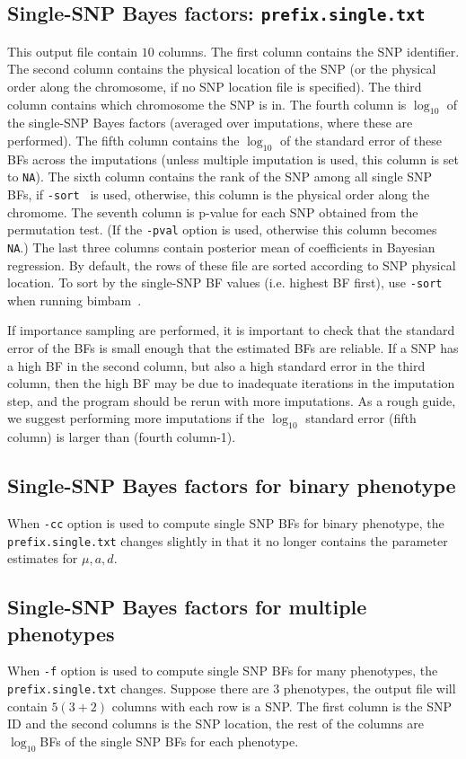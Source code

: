 \documentclass[11pt,Palatino]{article}
\def\bimbam{{\sc bimbam}~}
\begin{document}
\subsection{Single-SNP Bayes factors: {\tt prefix.single.txt}}

This output file contain $10$ columns. The first column contains the SNP identifier. The second column contains the physical location of the SNP
(or the physical order along the chromosome, if no SNP location file is specified). The third column contains which chromosome the SNP is in. The fourth column is $\log_{10}$ of the single-SNP Bayes factors (averaged over imputations, where these are performed).
The fifth column contains the $\log_{10}$ of the standard error of these BFs
across the imputations (unless multiple imputation is used, this column is set to {\tt NA}). The sixth column contains the rank of the SNP
among all single SNP BFs, if {\tt -sort } is used, otherwise, this column is the physical order along the chromome.   The seventh column is p-value for each SNP obtained from the permutation test. (If the {\tt -pval} option is used, otherwise this column becomes {\tt NA}.)
The last three columns contain posterior mean of coefficients in Bayesian regression.
By default, the rows of these file are sorted according to SNP physical location. To sort by the single-SNP BF values (i.e. highest BF first), use {\tt -sort} when running \bimbam.

If importance sampling are performed, it is important to check that the standard error
of the BFs is small enough that the estimated BFs are reliable.
If a SNP has a high BF in the second column, but also a high standard error in the third column,
then the high BF may be due to inadequate iterations in the imputation step, and the program should be rerun with more imputations.
As a rough guide, we suggest performing more imputations
if the $\log_{10}$ standard error (fifth column) is larger than (fourth column-1).

\subsection{Single-SNP Bayes factors for binary phenotype}
When {\tt -cc} option is used to compute single SNP BFs for binary phenotype, the {\tt prefix.single.txt} changes slightly in that it no longer contains the parameter estimates for $\mu, a, d$.

\subsection{Single-SNP Bayes factors for multiple phenotypes}
When {\tt -f} option is used to compute single SNP BFs for many phenotypes, the {\tt prefix.single.txt}  changes. Suppose there are $3$ phenotypes, the output file will contain $5 (3+2)$ columns with each row is a SNP. The first column is the SNP ID and the second columns is the SNP location, the rest of the columns are $\log_{10}$BFs of the single SNP BFs for each phenotype.  
\end{document}
